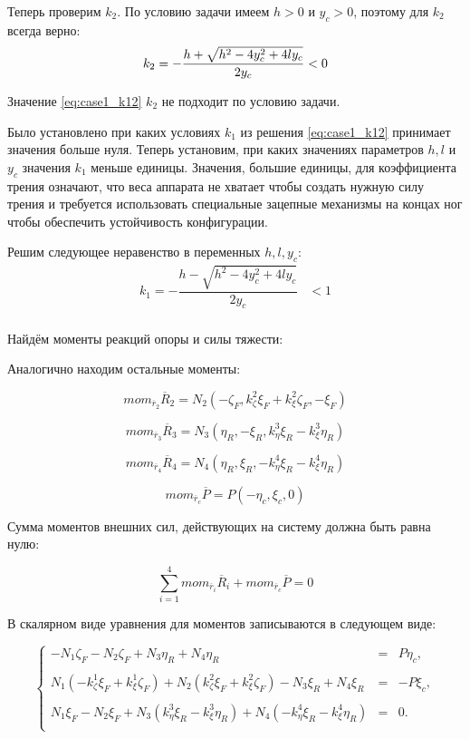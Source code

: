 Теперь проверим $k_2$. По условию задачи имеем $h > 0$ и $y_c > 0$, поэтому для $k_2$ всегда верно:
\[
    k_2 = -\dfrac{h + \sqrt{h^2 - 4y_c^2 + 4ly_c}}{2y_c} < 0\\
\]

Значение \ref{eq:case1_k12} $k_2$ не подходит по условию задачи.

Было установлено при каких условиях $k_1$ из решения \ref{eq:case1_k12} принимает значения больше нуля. Теперь установим, при каких значениях параметров $h,l$ и $y_c$ значения $k_1$ меньше единицы. Значения, большие единицы, для коэффициента трения означают, что веса аппарата не хватает чтобы создать нужную силу трения и требуется использовать специальные зацепные механизмы на концах ног чтобы обеспечить устойчивость конфигурации.

Решим следующее неравенство в переменных $h,l,y_c$:
\begin{equation}
\label{eq:case1_k_less_than_1}
  \begin{alignedat}{3}
  k_1 = - \dfrac{h - \sqrt{h^2 - 4y_c^2+4ly_c}}{2y_c} & < 1 \\
  \end{alignedat}
\end{equation}


Найдём моменты реакций опоры и силы тяжести:

Аналогично находим остальные моменты:

$$
mom_{\overline{r}_2}\overline{R}_2 = N_2(-\zeta_F,k_\zeta^2\xi_F+k_\xi^2\zeta_F,-\xi_F)
$$

$$
mom_{\overline{r}_3}\overline{R}_3 = N_3(\eta_R,-\xi_R,k_\eta^3\xi_R-k_\xi^3\eta_R)
$$

$$
mom_{\overline{r}_4}\overline{R}_4 = N_4(\eta_R,\xi_R,-k_\eta^4\xi_R-k_\xi^4\eta_R)
$$

$$
mom_{\overline{r}_c}\overline{P} = P(-\eta_c,\xi_c,0)
$$

Сумма моментов внешних сил, действующих на систему должна быть равна нулю:

$$
\sum_{i=1}^4 mom_{\overline{r}_i}\overline{R}_i+mom_{\overline{r}_c}\overline{P} = 0
$$

В скалярном виде уравнения для моментов записываются в следующем виде:

\begin{equation}
\left\{
\begin{array}{rcl}
-N_1\zeta_F-N_2\zeta_F+N_3\eta_R+N_4\eta_R & = & P\eta_c,\\
\\
N_1(-k_\zeta^1\xi_F+k_\xi^1\zeta_F)+N_2(k_\zeta^2\xi_F+k_\xi^2\zeta_F)-N_3\xi_R+N_4\xi_R & = & -P\xi_c,\\
\\
N_1\xi_F-N_2\xi_F+N_3(k_\eta^3\xi_R-k_\xi^3\eta_R)+N_4(-k_\eta^4\xi_R-k_\xi^4\eta_R) & = & 0.\\
\end{array}
\right.
\end{equation}

